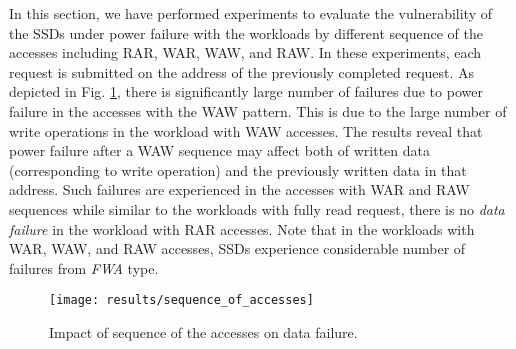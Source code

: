 In this section, we have performed experiments to evaluate the vulnerability of the SSDs under power failure with the workloads by different sequence of the accesses including RAR, WAR, WAW, and RAW. In these experiments, each request is submitted on the address of the previously completed request. As depicted in Fig. \ref{sequence_of_accesses}, there is significantly large number of failures due to power failure in the accesses with the WAW pattern. This is due to the large number of write operations in the workload with WAW accesses. The results reveal that power failure after a WAW sequence may affect both of written data (corresponding to write operation) and the previously written data in that address. Such failures are experienced in the accesses with WAR and RAW sequences while similar to the workloads with fully read request, there is no \emph{data failure} in the workload with RAR accesses. 
 Note that in the workloads with WAR, WAW, and RAW accesses,  SSDs experience considerable number of failures from \emph{FWA} type.


\begin{figure}[t]
	\centering
	\texttt{[image: results/sequence\_of\_accesses]}
	\vspace{-0.5em}
	\caption{Impact of sequence of the accesses on data failure.}
	\vspace{-2em}
	\label{sequence_of_accesses}
\end{figure}

